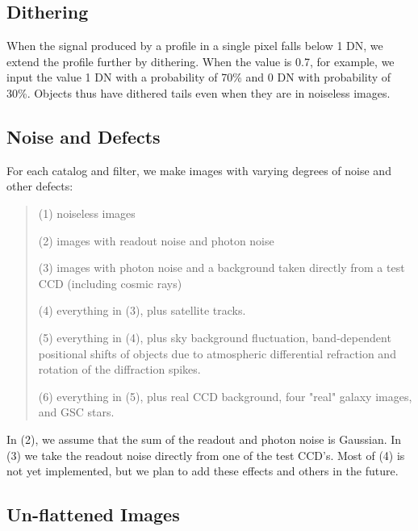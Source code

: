 \vspace{10pt}
\subsection{Dithering}

When the signal produced by a profile in a single pixel falls below 1 DN,
we extend the profile further by dithering. 
When the value is 0.7, for example,
we input the value 1 DN with a probability of 70\% and 0 DN 
with probability of 30\%.  Objects thus have dithered tails even when 
they are in noiseless images.   

\vspace{10pt}
\subsection{Noise and Defects}

For each catalog and filter, we make images with varying degrees of noise
and other defects:

\begin{quote}
    (1)  noiseless images

    (2) images with readout noise and photon noise

    (3) images with photon noise and a background taken directly from 
	a test CCD (including cosmic rays)

    (4) everything in (3), plus satellite tracks.

    (5) everything in (4), plus sky background fluctuation,
        band-dependent positional shifts of objects due to atmospheric 
        differential refraction and rotation of the diffraction spikes.

    (6) everything in (5), plus real CCD background, four "real"
        galaxy images, and GSC stars.
\end{quote}

In (2), we assume that the sum of the readout and photon noise is Gaussian.
In (3) we take the readout noise directly from one of the test CCD's.
Most of (4) is not yet implemented, but we plan to 
add these effects and others in the future.  

\vspace{10pt}
\subsection{Un-flattened Images}

